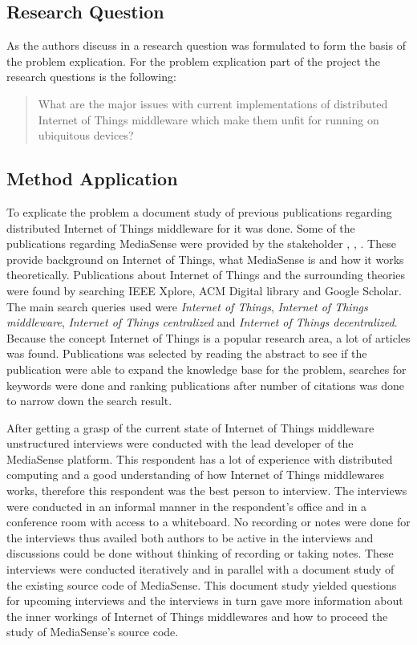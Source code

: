 \subsection{Research Question}
As the authors discuss in \cite{johannesson2012design} a research question was formulated to form the basis of the problem explication. For the problem explication part of the project the research questions is the following: 

\begin{quotation}
What are the major issues with current implementations of distributed Internet of Things middleware which make them unfit for running on ubiquitous devices?
\end{quotation}

\subsection{Method Application}
To explicate the problem a document study of previous publications regarding distributed Internet of Things middleware for it was done. Some of the publications regarding MediaSense were provided by the stakeholder \cite{TheMediaSenseFramework}, \cite{Kanter539187}, \cite{Walters413794}. These provide background on Internet of Things, what MediaSense is and how it works theoretically. Publications about Internet of Things and the surrounding theories were found by searching IEEE Xplore, ACM Digital library and Google Scholar. The main search queries used were \emph{Internet of Things}, \emph{Internet of Things middleware}, \emph{Internet of Things centralized} and \emph{Internet of Things decentralized}. Because the concept Internet of Things is a popular research area, a lot of articles was found. Publications was selected by reading the abstract to see if the publication were able to expand the knowledge base for the problem, searches for keywords were done and ranking publications after number of citations was done to narrow down the search result. 

After getting a grasp of the current state of Internet of Things middleware unstructured interviews were conducted with the lead developer of the MediaSense platform. This respondent has a lot of experience with distributed computing and a good understanding of how Internet of Things middlewares works, therefore this respondent was the best person to interview. The interviews were conducted in an informal manner in the respondent's office and in a conference room with access to a whiteboard. No recording or notes were done for the interviews thus availed both authors to be active in the interviews and discussions could be done without thinking of recording or taking notes. These interviews were conducted iteratively and in parallel with a document study of the existing source code of MediaSense. This document study yielded questions for upcoming interviews and the interviews in turn gave more information about the inner workings of Internet of Things middlewares and how to proceed the study of MediaSense's source code.

